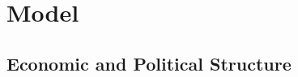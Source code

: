 \documentclass[handout]{beamer}
\begin{document}

 








\section{Model}
\subsection{Economic and Political Structure}
\end{document}
